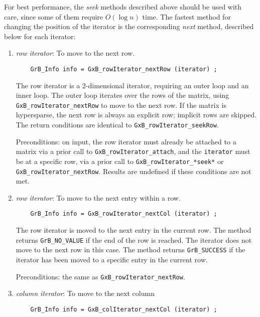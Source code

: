 \documentclass[12pt]{article}
\begin{document}
{For best performance, the {\em seek} methods described above should be used
with care, since some of them require $O(\log n)$ time.  The fastest method
for changing the position of the iterator is the corresponding {\em next}
method, described below for each iterator:

    \begin{enumerate}
    \item {\em row iterator}:  To move to the next row.

    {\footnotesize
    \begin{verbatim}
    GrB_Info info = GxB_rowIterator_nextRow (iterator) ; \end{verbatim}}

    The row iterator is a 2-dimensional iterator, requiring an outer loop and
    an inner loop.  The outer loop iterates over the rows of the matrix, using
    \verb'GxB_rowIterator_nextRow' to move to the next row.  If the matrix is
    hypersparse, the next row is always an explicit row; implicit rows are
    skipped.  The return conditions are identical to
    \verb'GxB_rowIterator_seekRow'.

    Preconditions: on input, the row iterator must already be attached to a
    matrix via a prior call to \verb'GxB_rowIterator_attach', and the
    \verb'iterator' must be at a specific row, via a prior call to
    \verb'GxB_rowIterator_*seek*' or \verb'GxB_rowIterator_nextRow'. 
    Results are undefined if these conditions are not met.

    \item {\em row iterator}:  To move to the next entry within a row.

    {\footnotesize
    \begin{verbatim}
    GrB_Info info = GxB_rowIterator_nextCol (iterator) ; \end{verbatim}}

    The row iterator is moved to the next entry in the current row.
    The method returns \verb'GrB_NO_VALUE' if the end of the row is reached.
    The iterator does not move to the next row in this case.
    The method returns \verb'GrB_SUCCESS' if the iterator has been moved
    to a specific entry in the current row.

    Preconditions: the same as \verb'GxB_rowIterator_nextRow'.

    \item {\em column iterator}:  To move to the next column

    {\footnotesize
    \begin{verbatim}
    GrB_Info info = GxB_colIterator_nextCol (iterator) ; \end{verbatim}}


\end{enumerate}}
\end{document}

